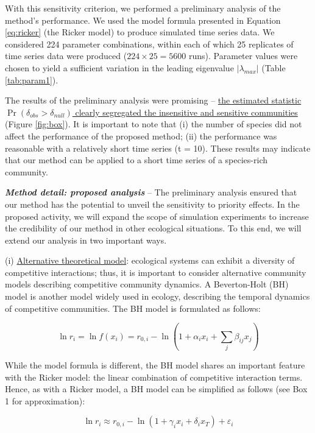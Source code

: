 \documentclass[12pt, class=article, crop=false]{standalone}
\begin{document}
With this sensitivity criterion, we performed a preliminary analysis of the method's performance. We used the model formula presented in Equation \ref{eq:ricker} (the Ricker model) to produce simulated time series data. We considered 224 parameter combinations, within each of which 25 replicates of time series data were produced ($224 \times 25 = 5600$ runs). Parameter values were chosen to yield a sufficient variation in the leading eigenvalue $|\lambda_{max}|$ (Table \ref{tab:param1}).

The results of the preliminary analysis were promising -- \ul{the estimated statistic $\Pr(\delta_{obs} > \delta_{null})$ clearly segregated the insensitive and sensitive communities} (Figure \ref{fig:box}). It is important to note that (i) the number of species did not affect the performance of the proposed method; (ii) the performance was reasonable with a relatively short time series (t = 10). These results may indicate that our method can be applied to a short time series of a species-rich community. 

\textbf{\textit{Method detail: proposed analysis}} -- 
The preliminary analysis ensured that our method has the potential to unveil the sensitivity to priority effects.
In the proposed activity, we will expand the scope of simulation experiments to increase the credibility of our method in other ecological situations.
To this end, we will extend our analysis in two important ways.

(i) \ul{Alternative theoretical model}: ecological systems can exhibit a diversity of competitive interactions; thus, it is important to consider alternative community models describing competitive community dynamics. 
A Beverton-Holt (BH) model is another model widely used in ecology, describing the temporal dynamics of competitive communities. The BH model is formulated as follows:

\begin{equation}
    \label{eq:bh}
    \ln r_i = \ln f(x_i) = r_{0,i} - \ln(1 + \alpha_i x_i + \sum_j \beta_{ij} x_j)
\end{equation}

While the model formula is different, the BH model shares an important feature with the Ricker model: the linear combination of competitive interaction terms.
Hence, as with a Ricker model, a BH model can be simplified as follows (see Box 1 for approximation):

\begin{equation}
    \label{eq:bhmod}
    \ln r_i \approx r_{0,i} - \ln(1 + \gamma_i x_i + \delta_i x_T) + \varepsilon_i
\end{equation}
\end{document}
